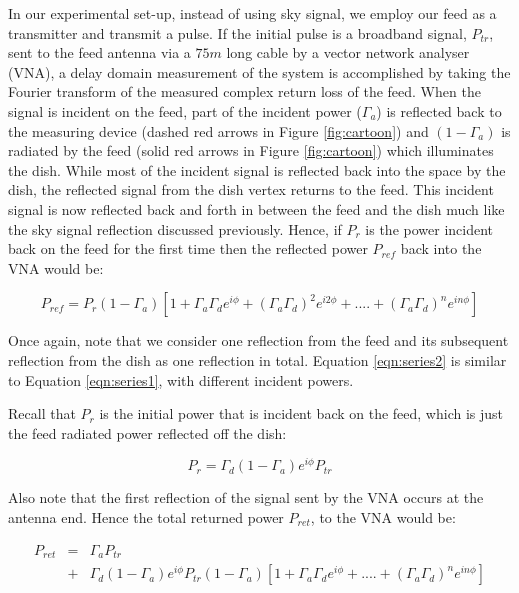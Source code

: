 \documentclass[12pt,preprint]{aastex}
\begin{document}
In our experimental set-up, instead of using sky signal, we employ
our feed as a transmitter and transmit a pulse. If the initial pulse is a broadband signal,
$P_{tr}$, sent to the feed antenna via a $75m$ long cable by a vector network
analyser (VNA), a delay domain measurement of the system is accomplished by
taking the Fourier transform of the measured complex return loss of the feed. When the signal is incident on
the feed, part of the incident power ($\Gamma_{a}$) is reflected back to the
measuring device (dashed red arrows in Figure \ref{fig:cartoon}) and
$(1-\Gamma_{a})$ is radiated by the feed (solid red arrows in Figure
\ref{fig:cartoon}) which illuminates the dish. While most of the incident signal is reflected back into the space by the dish, the reflected signal from the dish vertex returns to
the feed. This incident signal is now
reflected back and forth in between the feed and the dish much like the sky
signal reflection discussed previously.  Hence, if $P_{r}$ is the power
incident back on the feed for the first time then the reflected power $P_{ref}$
back into the VNA would be:

\begin{equation}\label{eqn:series2}
P_{ref} =  P_{r}(1-\Gamma_{a})[1+ \Gamma_{a}\Gamma_{d} e^{i\phi}+ (\Gamma_{a}\Gamma_{d})^2e^{i2\phi}+ ....+ (\Gamma_{a}\Gamma_{d})^{n}e^{in\phi}]
\end{equation}
 
Once again, note that we consider one reflection from the feed and its subsequent reflection from the dish as one reflection in total. Equation \ref{eqn:series2} is similar to Equation \ref{eqn:series1}, with different incident powers.

Recall that $P_{r}$ is the initial power that is incident back on the feed, which is just the feed radiated power reflected off the dish:
 
\begin{equation}
P_{r}= \Gamma_{d}(1-\Gamma_a)e^{i\phi} P_{tr}
\end{equation}

Also note that the first reflection of the signal sent by the VNA occurs at the antenna end. Hence the total returned power $P_{ret}$, to the VNA  would be:

\begin{eqnarray}
P_{ret} & = & \Gamma_{a}P_{tr} \nonumber\\ 
 & + &   \Gamma_{d}(1-\Gamma_a)e^{i\phi} P_{tr}(1-\Gamma_{a}) [1+ \Gamma_{a}\Gamma_{d} e^{i\phi}+  ....+ (\Gamma_{a}\Gamma_{d})^{n}e^{in\phi}]\nonumber\\
 \end{eqnarray}
 
\end{document}
